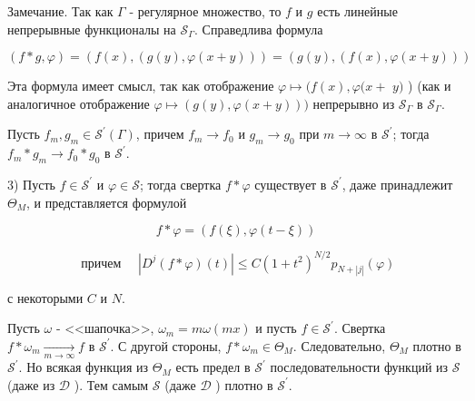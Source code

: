Замечание. Так как $\Gamma$ - регулярное множество, то $f$ и $g$ есть линейные непрерывные функционалы на $\mathcal{S}_{\Gamma}$. Справедлива формула

$$
(f * g, \varphi)=(f(x),(g(y), \varphi(x+y)))=(g(y),(f(x), \varphi(x+y)))
$$


Эта формула имеет смысл, так как отображение $\varphi \mapsto(f(x), \varphi(x+$ $y)$ ) (как и аналогичное отображение $\varphi \mapsto(g(y), \varphi(x+y)))$ непрерывно из $\mathcal{S}_{\Gamma}$ в $\mathcal{S}_{\Gamma}$.

Пусть $f_m, g_m \in \mathcal{S}^{\prime}(\Gamma)$, причем $f_m \rightarrow f_0$ и $g_m \rightarrow g_0$ при $m \rightarrow \infty$ в $\mathcal{S}^{\prime}$; тогда $f_m * g_m \rightarrow f_0 * g_0$ в $\mathcal{S}^{\prime}$.

3) Пусть $f \in \mathcal{S}^{\prime}$ и $\varphi \in \mathcal{S}$; тогда свертка $f * \varphi$ существует в $\mathcal{S}^{\prime}$, даже принадлежит $\Theta_M$, и представляется формулой

$$
f * \varphi=(f(\xi), \varphi(t-\xi))
$$


$$
\text { причем } \quad\left|D^j(f * \varphi)(t)\right| \leqslant C\left(1+t^2\right)^{N / 2} p_{N+|j|}(\varphi)
$$


с некоторыми $C$ и $N$.

Пусть $\omega$ - <<шапочка>>, $\omega_m=m \omega(m x)$ и пусть $f \in \mathcal{S}^{\prime}$. Свертка $f * \omega_m \xrightarrow[m \rightarrow \infty]{ } f$ в $\mathcal{S}^{\prime}$. С другой стороны, $f * \omega_m \in \Theta_M$. Следовательно, $\Theta_M$ плотно в $\mathcal{S}^{\prime}$. Но всякая функция из $\Theta_M$ есть предел в $\mathcal{S}^{\prime}$ последовательности функций из $\mathcal{S}$ (даже из $\mathcal{D}$ ). Тем самым $\mathcal{S}$ (даже $\mathcal{D}$ ) плотно в $\mathcal{S}^{\prime}$.